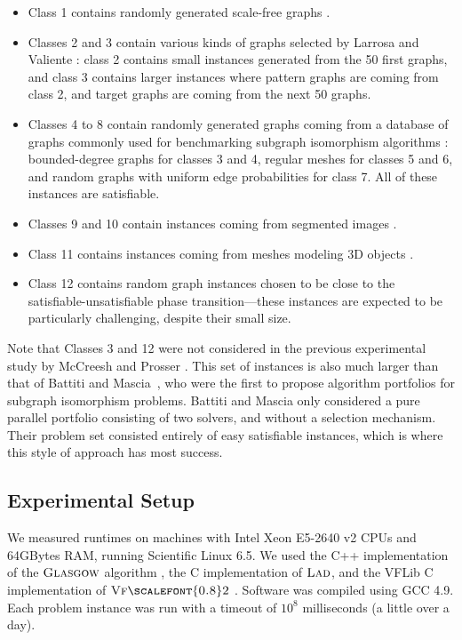 \documentclass{llncs}
\newcommand{\VFtwo}{$\textsc{Vf{\scalefont{0.8}2}}$\xspace}
\newcommand{\Glasgow}{$\textsc{Glasgow}$\xspace}
\newcommand{\LAD}{$\textsc{Lad}$\xspace}
\begin{document}
\begin{itemize}
\item Class 1 contains randomly generated scale-free graphs \cite{constraints10}.
\item Classes 2 and 3 contain various kinds of graphs selected by Larrosa and Valiente \cite{LV02}:
    class 2 contains small instances generated from the 50 first graphs, and class 3 contains
    larger instances where pattern graphs are coming from class 2, and target graphs are coming from
    the next 50 graphs.
\item Classes 4 to 8 contain randomly generated graphs coming from a database of graphs commonly
    used for benchmarking subgraph isomorphism algorithms
    \cite{GraphDatabase1,GraphDatabase2}: bounded-degree graphs for classes 3 and 4, regular meshes
    for classes 5 and 6, and random graphs with uniform edge probabilities for class 7. All of these
    instances are satisfiable.
\item Classes 9 and 10 contain instances coming from segmented images \cite{pr15,cviu11}.
\item Class 11 contains instances coming from meshes modeling 3D objects \cite{cviu11}.
\item Class 12 contains random graph instances chosen to be close to the satisfiable-unsatisfiable
    phase transition---these instances are expected to be particularly challenging, despite their
    small size.
\end{itemize}

Note that Classes 3 and 12 were not considered in the previous experimental study by McCreesh and
Prosser \cite{McCreesh:2015}.  This set of instances is also much larger than that of Battiti and
Mascia~\cite{battiti-mascia07}, who were the first to propose algorithm portfolios for subgraph
isomorphism problems.  Battiti and Mascia only considered a pure parallel portfolio consisting of
two solvers, and without a selection mechanism. Their problem set consisted entirely of easy
satisfiable instances, which is where this style of approach has most success.

\subsection{Experimental Setup}

We measured runtimes on machines with Intel Xeon E5-2640 v2 CPUs and 64GBytes RAM, running
Scientific Linux 6.5. We used the C++ implementation of the \Glasgow algorithm \cite{McCreesh:2015},
the C implementation of \LAD \cite{Solnon:2010}, and the VFLib C implementation of \VFtwo
\cite{Cordella:2004}. Software was compiled using GCC 4.9. Each problem instance was run with a
timeout of $10^8$ milliseconds (a little over a day).
\end{document}
